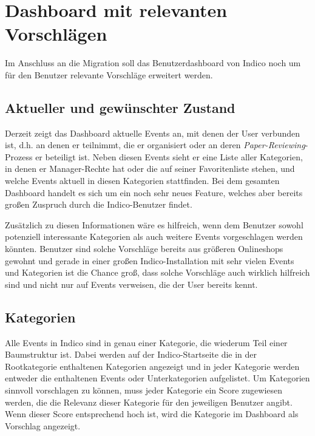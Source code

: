 \chapter{Dashboard mit relevanten Vorschlägen}

Im Anschluss an die Migration soll das Benutzerdashboard von Indico noch um für den Benutzer
relevante Vorschläge erweitert werden.


\section{Aktueller und gewünschter Zustand}

Derzeit zeigt das Dashboard aktuelle Events an, mit denen der User verbunden ist, d.h. an denen er
teilnimmt, die er organisiert oder an deren \emph{Paper-Reviewing}-Prozess er beteiligt ist. Neben
diesen Events sieht er eine Liste aller Kategorien, in denen er Manager-Rechte hat oder die auf
seiner Favoritenliste stehen, und welche Events aktuell in diesen Kategorien stattfinden. Bei dem
gesamten Dashboard handelt es sich um ein noch sehr neues Feature, welches aber bereits großen
Zuspruch durch die Indico-Benutzer findet.

Zusätzlich zu diesen Informationen wäre es hilfreich, wenn dem Benutzer sowohl potenziell
interessante Kategorien als auch weitere Events vorgeschlagen werden könnten. Benutzer sind solche
Vorschläge bereits aus größeren Onlineshops gewohnt und gerade in einer großen Indico-Installation
mit sehr vielen Events und Kategorien ist die Chance groß, dass solche Vorschläge auch wirklich
hilfreich sind und nicht nur auf Events verweisen, die der User bereits kennt.


\section{Kategorien}\label{categorysuggest}

Alle Events in Indico sind in genau einer Kategorie, die wiederum Teil einer Baumstruktur ist. Dabei
werden auf der Indico-Startseite die in der Rootkategorie enthaltenen Kategorien angezeigt und in
jeder Kategorie werden entweder die enthaltenen Events oder Unterkategorien aufgelistet. Um
Kategorien sinnvoll vorschlagen zu können, muss jeder Kategorie ein Score zugewiesen werden, die die
Relevanz dieser Kategorie für den jeweiligen Benutzer angibt. Wenn dieser Score entsprechend hoch
ist, wird die Kategorie im Dashboard als Vorschlag angezeigt.

